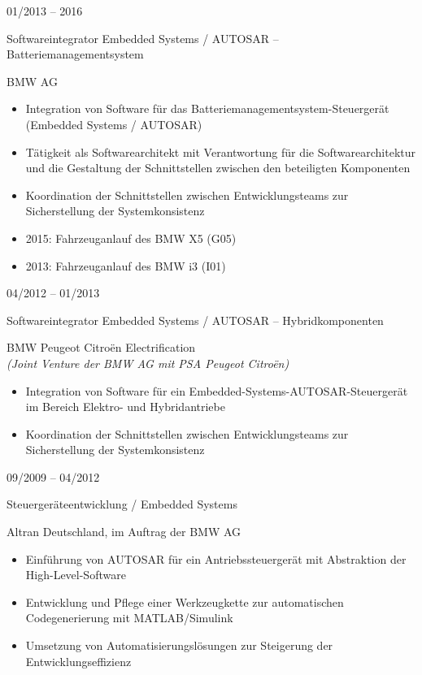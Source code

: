 \documentclass[a4paper,10pt]{article}
\newlength{\cvcolumngapwidth}
\newlength{\cvleftcolumnwidth}
\newlength{\cvrightcolumnwidth}
\newcommand{\cvtitlestyle}[1]{{\large\cvtitlefont\textcolor{cvtitlecolor}{#1}}}
\newcommand{\cvdurationstyle}[1]{{\small\cvdurationfont\textcolor{cvdurationcolor}{#1}}}
\newlength{\cvafteritemskipamount}
\newlength{\cvaftertitleskipamount}
\newlength{\cvparskip}
\newcommand{\cvitem}[2]{
    \begin{minipage}[t]{\cvleftcolumnwidth}
        \raggedleft #1
    \end{minipage}%
    \hspace{\cvcolumngapwidth}%
    \begin{minipage}[t]{\cvrightcolumnwidth}
        \setlength{\parskip}{\cvparskip} #2
    \end{minipage}

    \vspace{\cvafteritemskipamount}
}
\newcommand{\cvtitle}[1]{
    \cvtitlestyle{#1}

    \vspace{\cvaftertitleskipamount}
    \vspace{-\cvparskip}
}
\begin{document}
\cvitem{
    \cvdurationstyle{01/2013 -- 2016}
}{
    \cvtitle{Softwareintegrator Embedded Systems / AUTOSAR -- Batteriemanagementsystem}

    BMW AG

    \begin{itemize}[leftmargin=*]
        \item Integration von Software für das Batteriemanagementsystem-Steuergerät (Embedded Systems / AUTOSAR)
        \item Tätigkeit als Softwarearchitekt mit Verantwortung für die Softwarearchitektur und die Gestaltung der Schnittstellen zwischen den beteiligten Komponenten
        \item Koordination der Schnittstellen zwischen Entwicklungsteams zur Sicherstellung der Systemkonsistenz
        \item 2015: Fahrzeuganlauf des BMW X5 (G05)
        \item 2013: Fahrzeuganlauf des BMW i3 (I01)
    \end{itemize}
}

\cvitem{
    \cvdurationstyle{04/2012 -- 01/2013}
}{
    \cvtitle{Softwareintegrator Embedded Systems / AUTOSAR -- Hybridkomponenten}

    BMW Peugeot Citroën Electrification\\
    \textit{(Joint Venture der BMW AG mit PSA Peugeot Citroën)}

    \begin{itemize}[leftmargin=*]
        \item Integration von Software für ein Embedded-Systems-AUTOSAR-Steuergerät im Bereich Elektro- und Hybridantriebe
        \item Koordination der Schnittstellen zwischen Entwicklungsteams zur Sicherstellung der Systemkonsistenz
    \end{itemize}
}

\cvitem{
    \cvdurationstyle{09/2009 -- 04/2012}
}{
    \cvtitle{Steuergeräteentwicklung / Embedded Systems}

    Altran Deutschland, im Auftrag der BMW AG

    \begin{itemize}[leftmargin=*]
        \item Einführung von AUTOSAR für ein Antriebssteuergerät mit Abstraktion der High-Level-Software
        \item Entwicklung und Pflege einer Werkzeugkette zur automatischen Codegenerierung mit MATLAB/Simulink
        \item Umsetzung von Automatisierungslösungen zur Steigerung der Entwicklungseffizienz
    \end{itemize}
}
\end{document}
